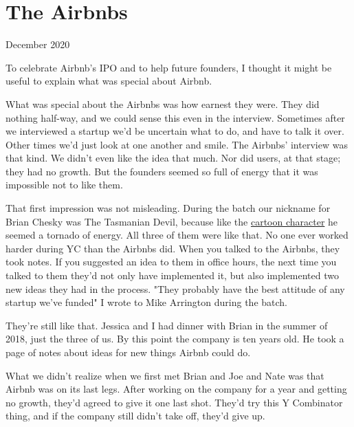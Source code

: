 \chapter{The Airbnbs}


            
              
                

December 2020

To celebrate Airbnb's IPO and to
                  help future founders, I thought it might be useful to explain
                  what was special about Airbnb.

What was special
                  about the Airbnbs was how earnest they were. They did nothing
                  half-way, and we could sense this even in the interview.
                  Sometimes after we interviewed a startup we'd be uncertain
                  what to do, and have to talk it over. Other times we'd just
                  look at one another and smile. The Airbnbs' interview was that
                  kind. We didn't even like the idea that much. Nor did users,
                  at that stage; they had no growth. But the founders seemed so
                  full of energy that it was impossible not to like them.

That
                  first impression was not misleading. During the batch our
                  nickname for Brian Chesky was The Tasmanian Devil, because
                  like the
                  \href{http://www.youtube.com/watch?v=StG2u5qfFRg\&t=2m27s}{cartoon character}
                  he seemed a tornado of energy. All three of them were like
                  that. No one ever worked harder during YC than the Airbnbs
                  did. When you talked to the Airbnbs, they took notes. If you
                  suggested an idea to them in office hours, the next time you
                  talked to them they'd not only have implemented it, but also
                  implemented two new ideas they had in the process. "They
                  probably have the best attitude of any startup we've funded" I
                  wrote to Mike Arrington during the batch.

They're
                  still like that. Jessica and I had dinner with Brian in the
                  summer of 2018, just the three of us. By this point the
                  company is ten years old. He took a page of notes about ideas
                  for new things Airbnb could do.

What we didn't
                  realize when we first met Brian and Joe and Nate was that
                  Airbnb was on its last legs. After working on the company for
                  a year and getting no growth, they'd agreed to give it one
                  last shot. They'd try this Y Combinator thing, and if the
                  company still didn't take off, they'd give up.

